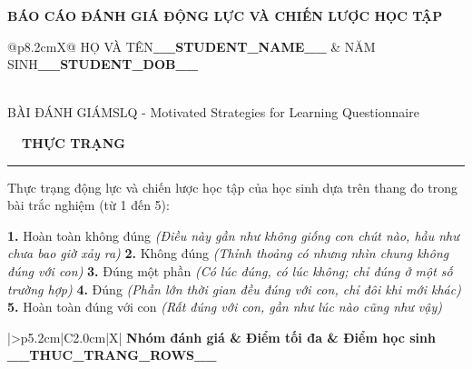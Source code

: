 \documentclass[12pt, a4paper]{article}
\newcommand{\sect}[2]{%
  \vspace{7pt}\par\noindent
  {\hf\bfseries\large\tikz[baseline=(s.base)]{\node[fill=brand,text=white,rounded corners=2pt,inner xsep=6pt,inner ysep=2pt](s){#1};}~~\textcolor{ink}{#2}}\par\vspace{1pt}%
  {\color{brand!70}\rule{\linewidth}{0.9pt}}\par\vspace{4pt}%
}
\newcommand{\thx}[1]{\hf\bfseries\color{ink}#1}
\begin{document}
\begin{center}
  {\hf\bfseries\large\color{brand}BÁO CÁO ĐÁNH GIÁ ĐỘNG LỰC VÀ CHIẾN LƯỢC HỌC TẬP}
\end{center}
\vspace{4pt}

\begin{tcolorbox}[enhanced, colback=neutral, colframe=brand!35, boxrule=0.6pt, arc=3pt,
  left=12pt, right=12pt, top=6pt, bottom=6pt, before skip=2pt, after skip=4pt]
\setlength{\parskip}{2pt}
\begin{tabularx}{\linewidth}{@{}p{8.2cm}X@{}}
{\hf\footnotesize\color{muted}HỌ VÀ TÊN}\quad\textbf{__STUDENT_NAME__} &
{\hf\footnotesize\color{muted}NĂM SINH}\quad\textbf{__STUDENT_DOB__}
\end{tabularx}\\[2pt]
{\hf\footnotesize\color{muted}BÀI ĐÁNH GIÁ}\quad MSLQ - Motivated Strategies for Learning Questionnaire
\end{tcolorbox}

\sect{I}{THỰC TRẠNG}
Thực trạng động lực và chiến lược học tập của học sinh dựa trên thang đo trong bài trắc nghiệm (từ 1 đến 5):

{\small\color{muted}
\textbf{1.} Hoàn toàn không đúng \textit{(Điều này gần như không giống con chút nào, hầu như chưa bao giờ xảy ra)}\newline
\textbf{2.} Không đúng \textit{(Thỉnh thoảng có nhưng nhìn chung không đúng với con)}\newline
\textbf{3.} Đúng một phần \textit{(Có lúc đúng, có lúc không; chỉ đúng ở một số trường hợp)}\newline
\textbf{4.} Đúng \textit{(Phần lớn thời gian đều đúng với con, chỉ đôi khi mới khác)}\newline
\textbf{5.} Hoàn toàn đúng với con \textit{(Rất đúng với con, gần như lúc nào cũng như vậy)}
}
\vspace{6pt}

\renewcommand{\arraystretch}{1.25}
\begin{tabularx}{\linewidth}{|>{\RaggedRight}p{5.2cm}|C{2.0cm}|X|}
\hline
{}
\thx{Nhóm đánh giá} & \centering\thx{Điểm tối đa} & \thx{Điểm học sinh} \\ \hline
__THUC_TRANG_ROWS__
\end{tabularx}
\vspace{8pt}
\end{document}

